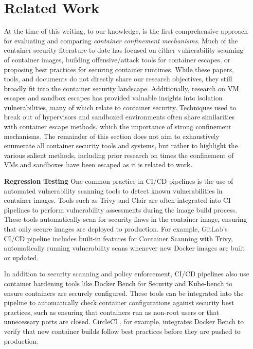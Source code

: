 \section{Related Work}%
\label{sec:related}

At the time of this writing, to our knowledge, \houdini is the first comprehensive approach for evaluating and comparing \textit{container confinement mechanisms}. Much of the container security literature to date has focused on either vulnerability scanning of container images, building offensive/attack tools for container escapes, or proposing best practices for securing container runtimes. While these papers, tools, and documents do not directly share our research objectives, they still broadly fit into the container security landscape. Additionally, research on VM escapes and sandbox escapes has provided valuable insights into isolation vulnerabilities, many of which relate to container security. Techniques used to break out of hypervisors and sandboxed environments often share similarities with container escape methods, which the importance of strong confinement mechanisms. The remainder of this section does not aim to exhaustively enumerate all container security tools and systems, but rather to highlight the various salient methods, including prior research on times the confinement of VMs and sandboxes have been escaped as it is related to work.

\noindent\textbf{Regression Testing} One common practice in CI/CD pipelines is the use of automated vulnerability scanning tools to detect known vulnerabilities in container images. Tools such as Trivy \cite{trivy} and Clair \cite{clair} are often integrated into CI pipelines to perform vulnerability assessments during the image build process. These tools automatically scan for security flaws in the container image, ensuring that only secure images are deployed to production. For example, GitLab’s CI/CD pipeline includes built-in features for Container Scanning with Trivy, automatically running vulnerability scans whenever new Docker images are built or updated.

In addition to security scanning and policy enforcement, CI/CD pipelines also use container hardening tools like Docker Bench for Security \cite{docker_bench} and Kube-bench \cite{kube_bench} to ensure containers are securely configured. These tools can be integrated into the pipeline to automatically check container configurations against security best practices, such as ensuring that containers run as non-root users or that unnecessary ports are closed. CircleCI \cite{circleci}, for example, integrates Docker Bench to verify that new container builds follow best practices before they are pushed to production.

